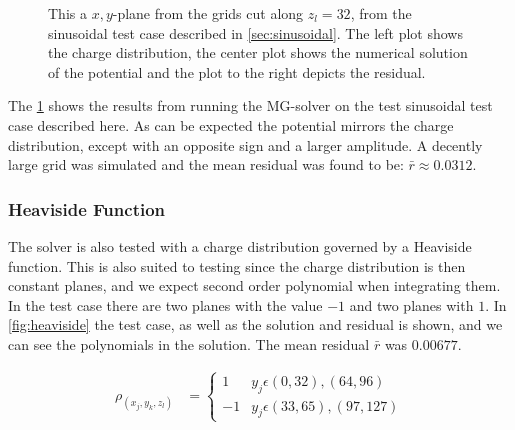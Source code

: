 \begin{figure}
\begin{subfigure}[b]{0.32\textwidth}
				\end{subfigure}
			\caption{This a \(x,y\)-plane from the grids cut along \(z_l = 32\), from the sinusoidal test case described in \cref{sec:sinusoidal}.
			The left plot shows the charge distribution, the center plot shows the numerical solution of the potential and the plot to the right depicts
			the residual.}
			\label{fig:sinusoidal}
		\end{figure}

		The \cref{fig:sinusoidal} shows the results from running the MG-solver on the test sinusoidal test case described here.
		As can be expected the potential mirrors the charge distribution, except with an opposite sign and a larger amplitude.
		A decently large grid was simulated and the mean residual was found to be: \(\bar{r} \approx 0.0312\).


		\subsubsection{Heaviside Function}
			The solver is also tested with a charge distribution governed by a Heaviside
			function. This is also suited to testing since the charge distribution is then
			constant planes, and we expect second order polynomial when integrating them.
			In the test case there are two planes with the value \(-1\) and two
			planes with \(1\). In \cref{fig:heaviside} the test case, as well as the solution and residual is
			shown, and we can see the polynomials in the solution. The mean residual \(\bar{r}\) was
			\(0.00677\).

		\begin{align}
			\rho_(x_j,y_k,z_l) &= \begin{cases} 1  & y_j \epsilon (0, 32), (64,96)\\ -1  & y_j \epsilon (33, 65), (97,127) \end{cases}
		\end{align}

